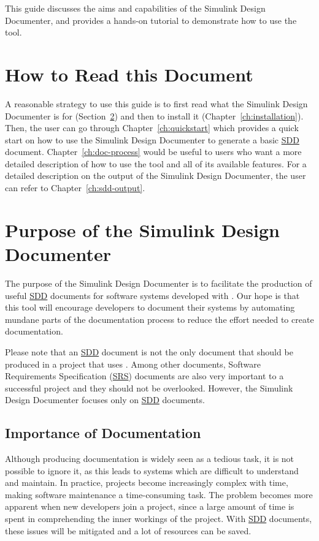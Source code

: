 \documentclass{mcscert}
\newcommand{\sddtool}{Simulink Design Documenter}
\begin{document}
This guide discusses the aims and capabilities of the \sddtool{}, 
and provides a hands-on tutorial to demonstrate how to use the tool.

\section{How to Read this Document}
A reasonable strategy to use this guide is to first read what the \sddtool{} is 
for (Section~\ref{sec:tool-purpose}) and then to install it (Chapter~\ref{ch:installation}).
Then, the user can go through Chapter~\ref{ch:quickstart} which provides a 
quick start on how to use the \sddtool{} to generate a basic \hyperref[acr:sdd]{SDD} document. 
Chapter~\ref{ch:doc-process} would be useful to users who want a more detailed 
description of how to use the tool and all of its available features. 
For a detailed description on the output of the \sddtool{}, 
the user can refer to Chapter~\ref{ch:sdd-output}.

\section{Purpose of the \sddtool{}} 
\label{sec:tool-purpose}
The purpose of the \sddtool{} is to facilitate the production of useful 
\hyperref[acr:sdd]{SDD} documents for software systems developed with 
\simulink{}.
Our hope is that this tool will encourage \simulink{} developers to document 
their systems by automating mundane parts of the documentation process to reduce
the effort needed to create documentation.

Please note that an \hyperref[acr:sdd]{SDD} document is not the only document 
that should be produced in a project that uses \simulink{}. 
Among other documents, Software Requirements Specification 
(\hyperref[acr:srs]{SRS}) documents are also very important to a successful 
project and they should not be overlooked. 
However, the \sddtool{} focuses only on \hyperref[acr:sdd]{SDD} documents.
  
\subsection{Importance of Documentation}
Although producing documentation is widely seen as a tedious task, 
it is not possible to ignore it, as this leads to systems which are difficult to
understand and maintain. 
In practice, projects become increasingly complex with time, making software 
maintenance a time-consuming task. 
The problem becomes more apparent when new developers join a project, since a 
large amount of time is spent in comprehending the inner workings of the 
project. 
With \hyperref[acr:sdd]{SDD} documents, these issues will be mitigated and a lot
of resources can be saved.
    
\end{document}
